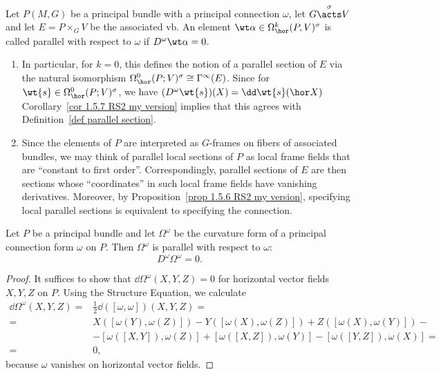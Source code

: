 \begin{defn}\label{def parallel horizontal form}
    Let $P(M,G)$ be a principal bundle with a principal connection $\omega$, let $G\overset{\sigma}{\acts}V$ and let $E=P\times_G V$ be the associated \gls{vb}. An element $\wt\alpha\in\Omega^k_{\hor}(P,V)^\sigma$ is called parallel with respect to $\omega$ if $D^\omega\wt\alpha=0$.
\end{defn}

\begin{rem}
    \begin{enumerate}
        \item In particular, for $k=0$, this defines the notion of a parallel section of $E$ via the natural isomorphism $\Omega^0_{\hor}(P;V)^\sigma\cong \Gamma^\infty(E)$. Since for $\wt{s}\in \Omega^0_{\hor}(P;V)^\sigma$, we have $(D^\omega \wt{s})(X)=\dd \wt{s}(\hor X)$ Corollary~\ref{cor 1.5.7 RS2 my version} implies that this agrees with Definition~\ref{def parallel section}.
        \item Since the elements of $P$ are interpreted as $G$-frames on fibers of associated bundles, we may think of parallel local sections of $P$ as local frame fields that are ``constant to first order''. Correspondingly, parallel sections of $E$ are then sections whose ``coordinates'' in such local frame fields have vanishing derivatives. Moreover, by Proposition~\ref{prop 1.5.6 RS2 my version}, specifying local parallel sections is equivalent to specifying the connection.
    \end{enumerate}
\end{rem}


\begin{prop} \label{prop 1.4.11 RS2}
    Let $P$ be a principal bundle and let $\Omega^\omega$ be the curvature form of a principal connection form $\omega$ on $P$. Then $\Omega^\omega$ is parallel with respect to $\omega$:
    \[D^\omega\Omega^\omega=0.\label{eq 1.4.10 RS2 Bianchi}\]
\end{prop}
\begin{proof}
    It suffices to show that $\dd\Omega^\omega(X,Y,Z)=0$ for horizontal vector fields $X,Y,Z$ on $P$. Using the Structure Equation, we calculate
    \begin{align}
        \dd\Omega^\omega(X,Y,Z)=&\frac12\dd([\omega,\omega])(X,Y,Z)=\\
        =&X([\omega(Y),\omega(Z)])-Y([\omega(X),\omega(Z)])+Z([\omega(X),\omega(Y)])-\\
        &-[\omega([X,Y]),\omega(Z)]+[\omega([X,Z]),\omega(Y)]-[\omega([Y,Z]),\omega(X)]=\\
        =&0,
    \end{align}
    because $\omega$ vanishes on horizontal vector fields.
\end{proof}

